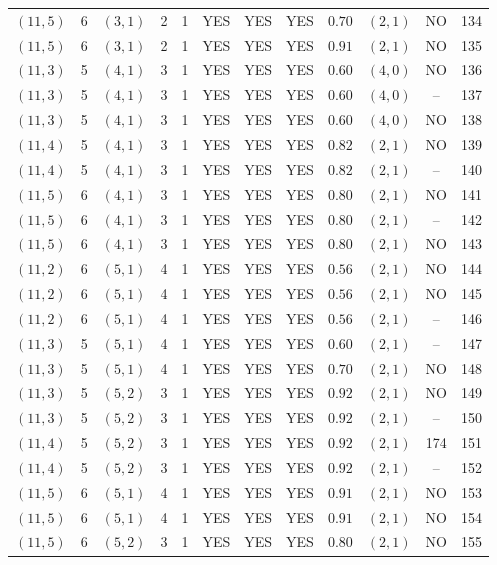 \begin{longtable}{|c|c|c|c|c|c|c|c|c|c|c|c|}
$(11,5)$ & 6 & $(3,1)$ & 2 & 1 & YES & YES & YES & $0.70$ & $(2,1)$ & NO & 134\\
$(11,5)$ & 6 & $(3,1)$ & 2 & 1 & YES & YES & YES & $0.91$ & $(2,1)$ & NO & 135\\
$(11,3)$ & 5 & $(4,1)$ & 3 & 1 & YES & YES & YES & $0.60$ & $(4,0)$ & NO & 136\\
$(11,3)$ & 5 & $(4,1)$ & 3 & 1 & YES & YES & YES & $0.60$ & $(4,0)$ & -- & 137\\
$(11,3)$ & 5 & $(4,1)$ & 3 & 1 & YES & YES & YES & $0.60$ & $(4,0)$ & NO & 138\\
$(11,4)$ & 5 & $(4,1)$ & 3 & 1 & YES & YES & YES & $0.82$ & $(2,1)$ & NO & 139\\
$(11,4)$ & 5 & $(4,1)$ & 3 & 1 & YES & YES & YES & $0.82$ & $(2,1)$ & -- & 140\\
$(11,5)$ & 6 & $(4,1)$ & 3 & 1 & YES & YES & YES & $0.80$ & $(2,1)$ & NO & 141\\
$(11,5)$ & 6 & $(4,1)$ & 3 & 1 & YES & YES & YES & $0.80$ & $(2,1)$ & -- & 142\\
$(11,5)$ & 6 & $(4,1)$ & 3 & 1 & YES & YES & YES & $0.80$ & $(2,1)$ & NO & 143\\
$(11,2)$ & 6 & $(5,1)$ & 4 & 1 & YES & YES & YES & $0.56$ & $(2,1)$ & NO & 144\\
$(11,2)$ & 6 & $(5,1)$ & 4 & 1 & YES & YES & YES & $0.56$ & $(2,1)$ & NO & 145\\
$(11,2)$ & 6 & $(5,1)$ & 4 & 1 & YES & YES & YES & $0.56$ & $(2,1)$ & -- & 146\\
$(11,3)$ & 5 & $(5,1)$ & 4 & 1 & YES & YES & YES & $0.60$ & $(2,1)$ & -- & 147\\
$(11,3)$ & 5 & $(5,1)$ & 4 & 1 & YES & YES & YES & $0.70$ & $(2,1)$ & NO & 148\\
$(11,3)$ & 5 & $(5,2)$ & 3 & 1 & YES & YES & YES & $0.92$ & $(2,1)$ & NO & 149\\
$(11,3)$ & 5 & $(5,2)$ & 3 & 1 & YES & YES & YES & $0.92$ & $(2,1)$ & -- & 150\\
$(11,4)$ & 5 & $(5,2)$ & 3 & 1 & YES & YES & YES & $0.92$ & $(2,1)$ & 174 & 151\\
$(11,4)$ & 5 & $(5,2)$ & 3 & 1 & YES & YES & YES & $0.92$ & $(2,1)$ & -- & 152\\
$(11,5)$ & 6 & $(5,1)$ & 4 & 1 & YES & YES & YES & $0.91$ & $(2,1)$ & NO & 153\\
$(11,5)$ & 6 & $(5,1)$ & 4 & 1 & YES & YES & YES & $0.91$ & $(2,1)$ & NO & 154\\
$(11,5)$ & 6 & $(5,2)$ & 3 & 1 & YES & YES & YES & $0.80$ & $(2,1)$ & NO & 155\\

\end{longtable}
